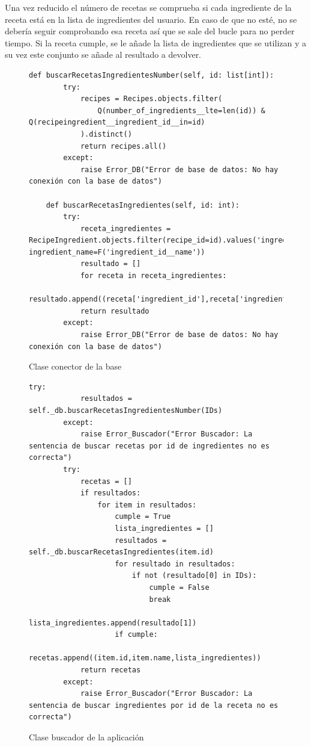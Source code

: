 Una vez reducido el número de recetas se comprueba si cada ingrediente de la receta está en la lista de ingredientes del usuario. En caso de que no esté, no se debería seguir comprobando esa receta así que se sale del bucle para no perder tiempo. Si la receta cumple, se le añade la lista de ingredientes que se utilizan y a su vez este conjunto se añade al resultado a devolver.
\begin{figure}[H!]
\begin{lstlisting}[style=C, caption={Métodos de la base de datos utilizados para buscar recetas por ingredientes}]
    def buscarRecetasIngredientesNumber(self, id: list[int]):
        try:
            recipes = Recipes.objects.filter(
                Q(number_of_ingredients__lte=len(id)) & Q(recipeingredient__ingredient_id__in=id)
            ).distinct()
            return recipes.all()
        except:
            raise Error_DB("Error de base de datos: No hay conexión con la base de datos")
        
    def buscarRecetasIngredientes(self, id: int):
        try:
            receta_ingredientes = RecipeIngredient.objects.filter(recipe_id=id).values('ingredient_id', ingredient_name=F('ingredient_id__name'))
            resultado = []
            for receta in receta_ingredientes:
                resultado.append((receta['ingredient_id'],receta['ingredient_name']))
            return resultado
        except:
            raise Error_DB("Error de base de datos: No hay conexión con la base de datos")
\end{lstlisting}
    \caption{Clase conector de la \gls{base}}
    \label{cmd:orm}
\end{figure}

\begin{figure}[H!]
    \begin{lstlisting}[style=C, caption={Método del buscador para buscar recetas por ingredientes}]
        try:
            resultados =  self._db.buscarRecetasIngredientesNumber(IDs)
        except:
            raise Error_Buscador("Error Buscador: La sentencia de buscar recetas por id de ingredientes no es correcta")
        try:
            recetas = []
            if resultados:
                for item in resultados:
                    cumple = True
                    lista_ingredientes = []
                    resultados = self._db.buscarRecetasIngredientes(item.id)
                    for resultado in resultados:
                        if not (resultado[0] in IDs):
                            cumple = False
                            break
                        lista_ingredientes.append(resultado[1])
                    if cumple:
                        recetas.append((item.id,item.name,lista_ingredientes))
            return recetas
        except:
            raise Error_Buscador("Error Buscador: La sentencia de buscar ingredientes por id de la receta no es correcta")
    \end{lstlisting}
        \caption{Clase buscador de la aplicación}
        \label{cmd:buscador}
    \end{figure}


